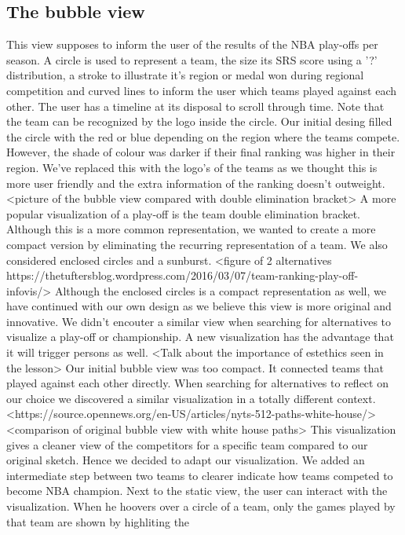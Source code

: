 \documentclass{sigchi}
\begin{document}
\subsection{The bubble view}
This view supposes to inform the user of the results of the NBA play-offs per 
season. A circle is used to represent a team, the size its SRS score using a '?'
distribution, a stroke to illustrate it's region or medal won during regional 
competition and curved lines to inform the user which teams played against each 
other. The user has a timeline at its disposal to scroll through time. Note that
the team can be recognized by the logo inside the circle. Our initial desing filled
the circle with the red or blue depending on the region where the teams compete. 
However, the shade of colour was darker if their final ranking was higher in their
region. We've replaced this with the logo's of the teams as we thought this is more
user friendly and the extra information of the ranking doesn't outweight.
<picture of the bubble view compared with double elimination bracket>
A more popular visualization of a play-off is the team double elimination bracket.
Although this is a more common representation, we wanted to create a more compact
version by eliminating the recurring representation of a team. We also considered 
enclosed circles and a sunburst.
<figure of 2 alternatives https://thetuftersblog.wordpress.com/2016/03/07/team-ranking-play-off-infovis/>
Although the enclosed circles is a compact representation as well, we have continued 
with our own design as we believe this view is more original and innovative. We 
didn't encouter a similar view when searching for alternatives to visualize a 
play-off or championship. A new visualization has the advantage that it will 
trigger persons as well.
<Talk about the importance of estethics seen in the lesson>
Our initial bubble view was too compact. It connected teams that played against
each other directly. When searching for alternatives to reflect on our choice we
discovered a similar visualization in a totally different context. 
<https://source.opennews.org/en-US/articles/nyts-512-paths-white-house/>
<comparison of original bubble view with white house paths>
This visualization gives a cleaner view of the competitors for a specific team
compared to our original sketch. Hence we decided to adapt our visualization. We
added an intermediate step between two teams to clearer indicate how teams competed
to become NBA champion.
Next to the static view, the user can interact with the visualization. When he 
hoovers over a circle of a team, only the games played by that team are shown by highliting the 
\end{document}
